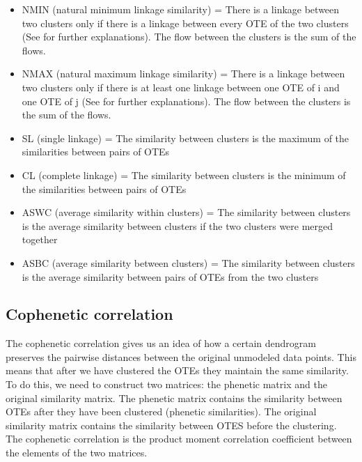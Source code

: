 \documentclass{article}
\begin{document}
    \begin{itemize}
        \item NMIN (natural minimum linkage similarity) = There is a linkage between two clusters only if there is a linkage between every OTE of the two clusters (See \citet{Martinez1991} for further explanations). The flow between the clusters is the sum of the flows. 
        \item NMAX (natural maximum linkage similarity) = There is a linkage between two clusters only if there is at least one linkage between one OTE of i and one OTE of j  (See \citet{Martinez1991} for further explanations). The flow between the clusters is the sum of the flows. 
        \item SL (single linkage) = The similarity between clusters is the maximum of the similarities between pairs of OTEs
        \item CL (complete linkage) = The similarity between clusters is the minimum of the similarities between pairs of OTEs
        \item ASWC (average similarity within clusters) = The similarity between clusters is the average similarity between clusters if the two clusters were merged together
        \item ASBC (average similarity between clusters) = The similarity between clusters is the average similarity between pairs of OTEs from the two clusters
    \end{itemize}






    \subsection{Cophenetic correlation}
    The cophenetic correlation gives us an idea of how a certain dendrogram preserves the pairwise distances between the original unmodeled data points. 
    This means that after we have clustered the OTEs they maintain the same similarity. To do this, we need to construct two matrices: the phenetic matrix and the original similarity matrix.
    The phenetic matrix contains the similarity between OTEs after they have been clustered (phenetic similarities). 
    The original similarity matrix contains the similarity between OTES before the clustering. 
    The cophenetic correlation is the product moment correlation coefficient between the elements of the two matrices.
\end{document}
